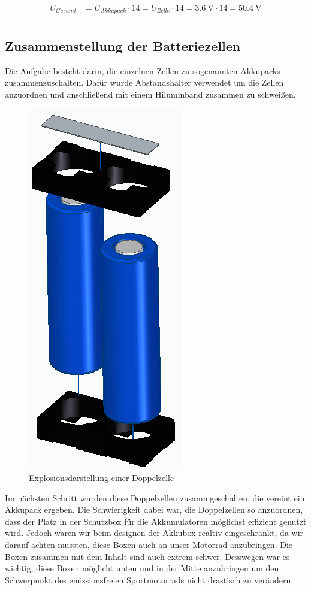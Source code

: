 \begin{align*}
U_{Gesamt} &= U_{Akkupack} \cdot 14= U_{Zelle} \cdot 14= 3.6~\mathrm{V} \cdot 14 = 50.4~\mathrm{V}\\
\end{align*}
\newpage

\subsection{Zusammenstellung der Batteriezellen}
Die Aufgabe besteht darin, die einzelnen Zellen zu sogenannten Akkupacks zusammenzuschalten. Dafür wurde Abstandshalter verwendet um die Zellen anzuordnen und anschließend mit einem Hiluminband zusammen zu schweißen. 

\begin{figure}[H]
	\begin{center}
		\includegraphics[scale=0.5]{figures/Akku/Explosionsdarstellung2Zellen.PNG}
		\caption{Explosionsdarstellung einer Doppelzelle}
	\end{center}
\end{figure}

Im nächsten Schritt wurden diese Doppelzellen zusammgeschalten, die vereint ein Akkupack ergeben. Die Schwierigkeit dabei war, die Doppelzellen so anzuordnen, dass der Platz in der Schutzbox für die Akkumulatoren möglichst effizient genutzt wird. Jedoch waren wir beim designen der Akkubox realtiv eingeschränkt, da wir darauf achten mussten, diese Boxen auch an unser Motorrad anzubringen. Die Boxen zusammen mit dem Inhalt sind auch extrem schwer. Desswegen war es wichtig, diese Boxen möglicht unten und in der Mitte anzubringen um den Schwerpunkt des emissionsfreien Sportmotorrads nicht drastisch zu verändern.

